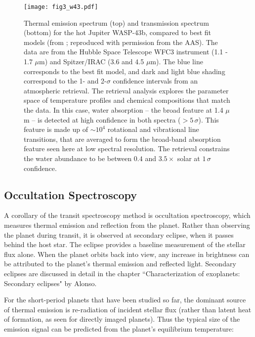 \documentclass[graybox,natbib,nosecnum]{svmult}
\begin{document}
\begin{figure}
\begin{centering}
\texttt{[image: fig3\_w43.pdf]}
\caption{Thermal emission spectrum (top) and transmission spectrum (bottom) for the hot Jupiter WASP-43b, compared to best fit models (from \citealt{kreidberg15b}; reproduced with permission from the AAS). The data are from the Hubble Space Telescope WFC3 instrument (1.1 - 1.7 $\mu$m) and Spitzer/IRAC (3.6 and 4.5 $\mu$m). The blue line corresponds to the best fit model, and dark and light blue shading correspond to the 1- and 2-$\sigma$ confidence intervals from an atmospheric retrieval. The retrieval analysis explores the parameter space of temperature profiles and chemical compositions that match the data. In this case, water absorption -- the broad feature at 1.4 $\mu$m -- is detected at high confidence in both spectra ($>5\,\sigma$). This feature is made up of $\sim10^4$ rotational and vibrational line transitions, that are averaged to form the broad-band absorption feature seen here at low spectral resolution. The retrieval constrains the water abundance to be between $0.4$ and $3.5\times$ solar at $1\,\sigma$ confidence.} 
\label{fig:spectra}       
\end{centering}
\end{figure}


\subsection{Occultation Spectroscopy}
A corollary of the transit spectroscopy method is occultation spectroscopy, which measures thermal emission and reflection from the planet. Rather than observing the planet during transit, it is observed at secondary eclipse, when it passes behind the host star. The eclipse provides a baseline measurement of the stellar flux alone. When the planet orbits back into view, any increase in brightness can be attributed to the planet's thermal emission and reflected light. Secondary eclipses are discussed in detail in the chapter ``Characterization of exoplanets: Secondary eclipses" by Alonso.

For the short-period planets that have been studied so far, the dominant source of thermal emission is re-radiation of incident stellar flux (rather than latent heat of formation, as seen for directly imaged planets). Thus the typical size of the emission signal can be predicted from the planet's equilibrium temperature:
\end{document}
